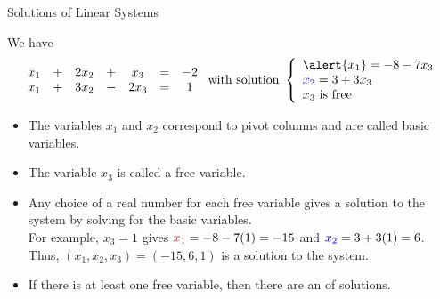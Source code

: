 \documentclass[xcolor=dvipsnames,aspectratio=169,t]{beamer}
\begin{document}
\begin{frame}{Solutions of Linear Systems}

We have   
\[   \begin{array}{ccccccc}
    x_1 & + & 2x_2 & + & x_3&=&-2\\
    x_1 & + & 3x_2 & - & 2x_3 &=& 1
\end{array}
\mbox{ with solution }
\left\{ \begin{array}{l}
  \alert{x_1} = -8 - 7x_3\\
  \colorb{x_2} = 3+3x_3 \\ 
  x_3 \mbox{ is free}  \end{array} \right. \]

  \begin{itemize}
  \item The variables $x_1$ and $x_2$ correspond to pivot columns and are called \alert{basic variables}.
  \item The variable $x_3$ is called a \alert{free variable}.
  \item Any choice of a real number for each free variable gives a solution to the system by solving for the basic variables.\\\smallskip
  \quad For example,
    $x_3=1$ gives $\colorr{x_1}=-8-7(1)=-15$ and $\textcolor{blue}{x_2}=3+3(1)=6$.\\
  \quad Thus, $(x_1,x_2,x_3)=(-15,6,1)$ is a solution to the system.
  \smallskip
  \pause
  \item If there is at least one free variable, then there are an  of solutions.
  \end{itemize}

\end{frame}
\end{document}

